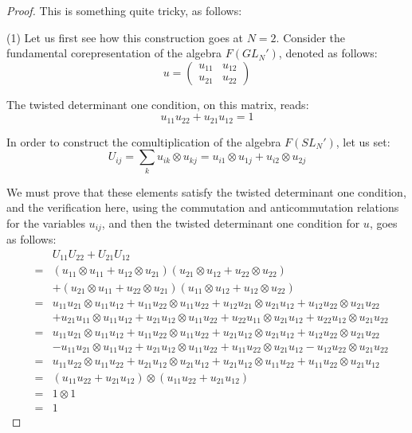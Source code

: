 \documentclass[12pt]{amsbook}
\begin{document}
\begin{proof}
This is something quite tricky, as follows:

\medskip

(1) Let us first see how this construction goes at $N=2$. Consider the fundamental corepresentation of the algebra $F(GL_N')$, denoted as follows:
$$u=\begin{pmatrix}u_{11}&u_{12}\\ u_{21}&u_{22}\end{pmatrix}$$

The twisted determinant one condition, on this matrix, reads:
$$u_{11}u_{22}+u_{21}u_{12}=1$$

In order to construct the comultiplication of the algebra $F(SL_N')$, let us set:
$$U_{ij}=\sum_ku_{ik}\otimes u_{kj}=u_{i1}\otimes u_{1j}+u_{i2}\otimes u_{2j}$$

We must prove that these elements satisfy the twisted determinant one condition, and the verification here, using the commutation and anticommutation relations for the variables $u_{ij}$, and then the twisted determinant one condition for $u$, goes as follows:
\begin{eqnarray*}
&&U_{11}U_{22}+U_{21}U_{12}\\
&=&(u_{11}\otimes u_{11}+u_{12}\otimes u_{21})(u_{21}\otimes u_{12}+u_{22}\otimes u_{22})\\
&&+(u_{21}\otimes u_{11}+u_{22}\otimes u_{21})(u_{11}\otimes u_{12}+u_{12}\otimes u_{22})\\
&=&u_{11}u_{21}\otimes u_{11}u_{12}+u_{11}u_{22}\otimes u_{11}u_{22}
+u_{12}u_{21}\otimes u_{21}u_{12}+u_{12}u_{22}\otimes u_{21}u_{22}\\
&&+u_{21}u_{11}\otimes u_{11}u_{12}+u_{21}u_{12}\otimes u_{11}u_{22}
+u_{22}u_{11}\otimes u_{21}u_{12}+u_{22}u_{12}\otimes u_{21}u_{22}\\
&=&u_{11}u_{21}\otimes u_{11}u_{12}+u_{11}u_{22}\otimes u_{11}u_{22}
+u_{21}u_{12}\otimes u_{21}u_{12}+u_{12}u_{22}\otimes u_{21}u_{22}\\
&&-u_{11}u_{21}\otimes u_{11}u_{12}+u_{21}u_{12}\otimes u_{11}u_{22}
+u_{11}u_{22}\otimes u_{21}u_{12}-u_{12}u_{22}\otimes u_{21}u_{22}\\
&=&u_{11}u_{22}\otimes u_{11}u_{22}+u_{21}u_{12}\otimes u_{21}u_{12}
+u_{21}u_{12}\otimes u_{11}u_{22}+u_{11}u_{22}\otimes u_{21}u_{12}\\
&=&(u_{11}u_{22}+u_{21}u_{12})\otimes(u_{11}u_{22}+u_{21}u_{12})\\
&=&1\otimes1\\
&=&1
\end{eqnarray*}


\end{proof}
\end{document}
